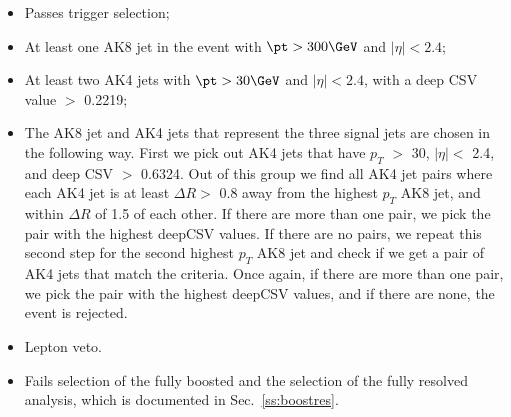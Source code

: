 \begin{itemize}
 \item Passes trigger selection;
 \item At least one AK8 jet in the event with $\pt > 300\GeV$ and $|\eta| < 2.4$;
 \item At least two AK4 jets with $\pt > 30\GeV$ and $|\eta| < 2.4$, with a deep CSV value $>$ 0.2219;
 \item The AK8 jet and AK4 jets that represent the three signal jets are chosen in the following way. First we pick out AK4 jets that have $p_{T}$ $>$ 30, $|\eta| <$ 2.4, and deep CSV $>$ 0.6324. Out of this group we find all AK4 jet pairs where each AK4 jet is at least $\Delta R >$ 0.8 away from the highest $p_{T}$ AK8 jet, and within $\Delta R$ of 1.5 of each other. If there are more than one pair, we pick the pair with the highest deepCSV values. If there are no pairs, we repeat this second step for the second highest $p_{T}$ AK8 jet and check if we get a pair of AK4 jets that match the criteria. Once again, if there are more than one pair, we pick the pair with the highest deepCSV values, and if there are none, the event is rejected. 
 \item Lepton veto.
  \item Fails selection of the fully boosted and the selection of the fully resolved analysis, which is documented in Sec.~\ref{ss:boostres}.
\end{itemize}

